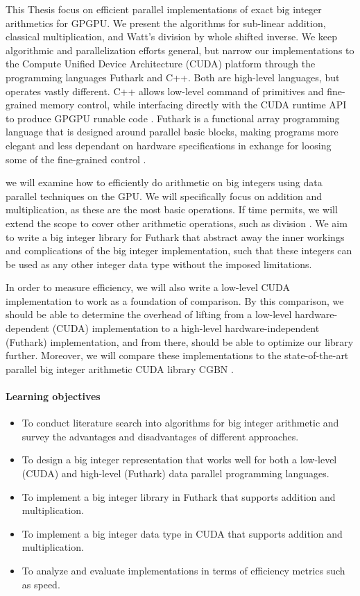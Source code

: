 This Thesis focus on efficient parallel implementations of exact big integer
arithmetics for GPGPU. We present the algorithms for sub-linear addition,
classical multiplication, and Watt's division by whole shifted inverse. We keep
algorithmic and parallelization efforts general, but narrow our implementations
to the Compute Unified Device Architecture (CUDA) platform through the
programming languages Futhark and C++. Both are high-level languages, but
operates vastly different. C++ allows low-level command of primitives and
fine-grained memory control, while interfacing directly with the CUDA runtime
API to produce GPGPU runable code \cite{cudaguide}. Futhark is a functional
array programming language that is designed around parallel basic blocks, making
programs more elegant and less dependant on hardware specifications in exhange
for loosing some of the fine-grained control
\cite{Henriksen:2017:FPF:3062341.3062354}.

{}

we will examine how to efficiently do arithmetic on big
integers using data parallel techniques on the GPU. We will specifically focus
on addition and multiplication, as these are the most basic operations. If time
permits, we will extend the scope to cover other arithmetic operations, such as
division \cite{watt2023efficient}. We aim to write a big integer library for
Futhark that abstract away the inner workings and complications of the big
integer implementation, such that these integers can be used as any other
integer data type without the imposed limitations.

In order to measure efficiency, we will also write a low-level CUDA
implementation to work as a foundation of comparison. By this comparison, we
should be able to determine the overhead of lifting from a low-level
hardware-dependent (CUDA) implementation to a high-level hardware-independent
(Futhark) implementation, and from there, should be able to optimize our
library further. Moreover, we will compare these implementations to the
state-of-the-art parallel big integer arithmetic CUDA library CGBN \cite{CGBN}.

\paragraph{Learning objectives}
\begin{itemize}
  \item To conduct literature search into algorithms for big integer arithmetic
    and survey the advantages and disadvantages of different approaches.
  \item To design a big integer representation that works well for both a
    low-level (CUDA) and high-level (Futhark) data parallel programming
    languages.
  \item To implement a big integer library in Futhark that supports addition
    and multiplication.
  \item To implement a big integer data type in CUDA that supports addition and
    multiplication.
  \item To analyze and evaluate implementations in terms of efficiency metrics
    such as speed.
  \end{itemize}

